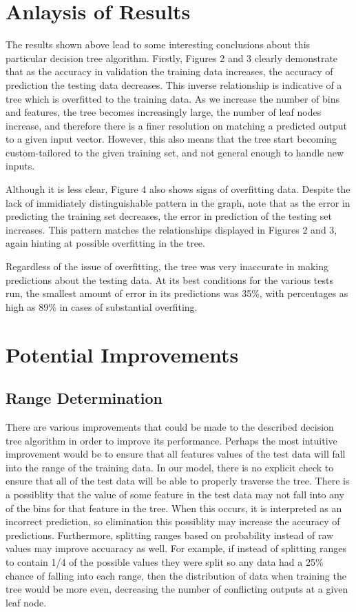 \documentclass{article}
\begin{document}
	\section{Anlaysis of Results}
	The results shown above lead to some interesting conclusions about this particular decision tree algorithm. Firstly, Figures 2 and 3 clearly demonstrate that as the accuracy in validation the training data increases, the accuracy of prediction the testing data decreases. This inverse relationship is indicative of a tree which is overfitted to the training data. As we increase the number of bins and features, the tree becomes increasingly large, the number of leaf nodes increase, and therefore there is a finer resolution on matching a predicted output to a given input vector. However, this also means that the tree start becoming custom-tailored to the given training set, and not general enough to handle new inputs.
	
	Although it is less clear, Figure 4 also shows signs of overfitting data. Despite the lack of immidiately distinguishable pattern in the graph, note that as the error in predicting the training set decreases, the error in prediction of the testing set increases. This pattern matches the relationships displayed in Figures 2 and 3, again hinting at possible overfitting in the tree.
	
	Regardless of the issue of overfitting, the tree was very inaccurate in making predictions about the testing data. At its best conditions for the various tests run, the smallest amount of error in its predictions was 35\%, with percentages as high as 89\% in cases of substantial overfiting.
	
	\clearpage
	\section{Potential Improvements}	
	\subsection{Range Determination}
	There are various improvements that could be made to the described decision tree algorithm in order to improve its performance. Perhaps the most intuitive improvement would be to ensure that all features values of the test data will fall into the range of the training data. In our model, there is no explicit check to ensure that all of the test data will be able to properly traverse the tree. There is a possiblity that the value of some feature in the test data may not fall into any of the bins for that feature in the tree. When this occurs, it is interpreted as an incorrect prediction, so elimination this possiblity may increase the accuracy of predictions. Furthermore, splitting ranges based on probability instead of raw values may improve accuaracy as well. For example, if instead of splitting ranges to contain 1/4 of the possible values they were split so any data had a 25\% chance of falling into each range, then the distribution of data when training the tree would be more even, decreasing the number of conflicting outputs at a given leaf node.
	
\end{document}
